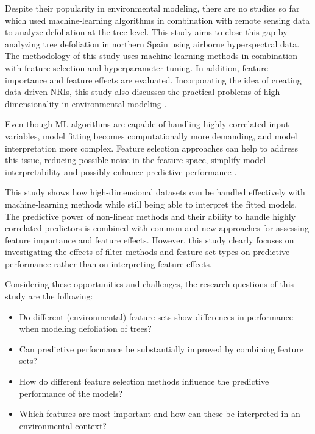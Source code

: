 \documentclass[letterpaper, peerreview, draftcls]{IEEEtran}
\begin{document}

Despite their popularity in environmental modeling, there are no studies so far which used machine-learning algorithms in combination with remote sensing data to analyze defoliation at the tree level.
This study aims to close this gap by analyzing tree defoliation in northern Spain using airborne hyperspectral data.
The methodology of this study uses machine-learning methods in combination with feature selection and hyperparameter tuning.
In addition, feature importance and feature effects are evaluated.
Incorporating the idea of creating data-driven \ac{NRI}s, this study also discusses the practical problems of high dimensionality in environmental modeling \cite{trunk1979, xu2016}.

Even though \ac{ML} algorithms are capable of handling highly correlated input variables, model fitting becomes computationally more demanding, and model interpretation more complex.
Feature selection approaches can help to address this issue, reducing possible noise in the feature space, simplify model interpretability and possibly enhance predictive performance \cite{cai2018}.

This study shows how high-dimensional datasets can be handled effectively with machine-learning methods while still being able to interpret the fitted models.
The predictive power of non-linear methods and their ability to handle highly correlated predictors is combined with common and new approaches for assessing feature importance and feature effects.
However, this study clearly focuses on investigating the effects of filter methods and feature set types on predictive performance rather than on interpreting feature effects.

Considering these opportunities and challenges, the research questions of this study are the following:

\begin{itemize}

	\item Do different (environmental) feature sets show differences in performance when modeling defoliation of trees?

	\item Can predictive performance be substantially improved by combining feature sets?

	\item How do different feature selection methods influence the predictive performance of the models?

	\item Which features are most important and how can these be interpreted in an environmental context?

\end{itemize}
\end{document}
